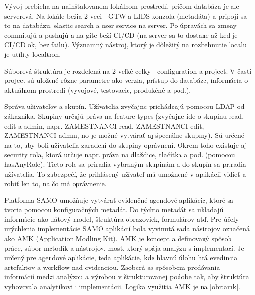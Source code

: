 Vývoj prebieha na nainštalovanom lokálnom prostredí, pričom databáza je ale serverová. Na lokále bežia 2 veci - GTW a LIDS konzola (metadáta) a pripojí sa to na databázu, elastic search a user service na server. Po úpravách sa zmeny commitujú a pushujú a na gite beží CI/CD (na server sa to dostane až keď je CI/CD ok, bez failu). Významný nástroj, ktorý je dôležitý na rozbehnutie localu je utility localtron. 

Súborová štruktúra je rozdelená na 2 veľké celky - configuration a project. V časti project sú uložené rôzne parametre ako verzia, prístup do databáze, informácia o aktuálnom prostredí (vývojové, testovacie, produkčné a pod.). 

Správa uživateľov a skupín. Užívatelia zvyčajne prichádzajú pomocou LDAP od zákazníka. Skupiny určujú práva na feature types (zvyčajne ide o skupinu read, edit a admin, napr. ZAMESTNANCI-read, ZAMESTNANCI-edit, ZAMESTNANCI-admin, no je možné vytvárať aj špeciálne skupiny). Sú určené na to, aby boli užívatelia zaradení do skupiny oprávnení. Okrem toho existuje aj security rola, ktorá určuje napr. práva na dlaždice, tlačítka a pod. (pomocou hasAnyRole). Tieto role sa priradia vybraným skupinám a do skupín sa priradia užívatelia. To zabezpečí, že prihlásený užívateľ má umožnené v aplikácii vidieť a robiť len to, na čo má oprávnenie.


Platforma SAMO umožňuje vytvárať evidenčné agendové aplikácie, ktoré sa tvoria pomocou konfiguračných metadát. Do týchto metadát sa ukladajú informácie ako dátový model, štruktúra obrazoviek, formulárov atď. Pre účely urýchlenia implementácie SAMO aplikácií bola vyvinutá sada nástrojov označená ako AMK (Application Modling Kit). AMK je koncept a definovaný spôsob práce, súbor metodík a nástrojov, most, ktorý spája analýzu s implementací. Je určený pre agendové aplikácie, teda aplikácie, kde hlavnú úlohu hrá evedincia artefaktov a workflow nad evidenciou. Zaoberá sa spôsobom predávania informácií medzi analýzou a výrobou v štrukturovanej podobe tak, aby štruktúra vyhovovala analytikovi i implementácii. Logika využitia AMK je na [obr:amk].

%

